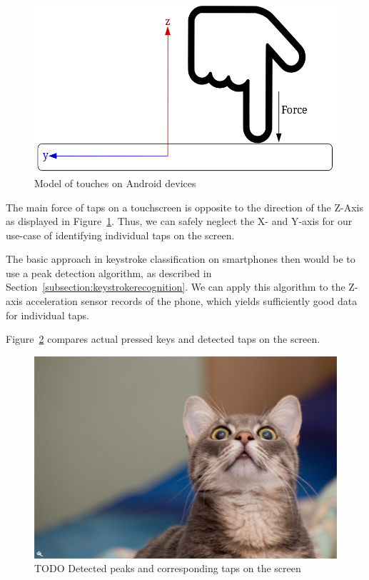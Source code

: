 \begin{figure}
    \centering
    \includegraphics[width=\textwidth]{figures/TapDirection.png}
    \caption{Model of touches on Android devices}
    \label{fig:touchdirection}
\end{figure}
The main force of taps on a touchscreen is opposite to the direction of the Z-Axis as displayed in Figure~\ref{fig:touchdirection}. Thus, we can safely neglect the X- and Y-axis for our use-case of identifying individual taps on the screen.

The basic approach in keystroke classification on smartphones then would be to use a peak detection algorithm, as described in Section~\ref{subsection:keystrokerecognition}. We can apply this algorithm to the Z-axis acceleration sensor records of the phone, which yields sufficiently good data for individual taps.

Figure~\ref{fig:taprecognition} compares actual pressed keys and detected taps on the screen.

\begin{figure}
    \centering
    \includegraphics[width=\linewidth]{figures/lucifero_lolcat_by_fraterorion-d4q5ol0.jpg}
    \caption{TODO Detected peaks and corresponding taps on the screen}
    \label{fig:taprecognition}
\end{figure}

